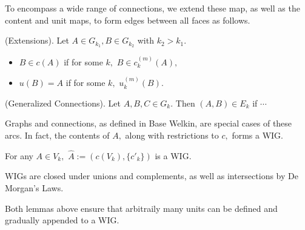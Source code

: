To encompass a wide range of connections, we extend these map, as well as the content and unit maps, to form edges between all faces as follows.
\begin{definition} (Extensions). Let $A \in G_{k_{1}}, B \in G_{k_{2}}$ with $k_{2} > k_{1}.$
    \begin{itemize}
      \item $B \in c(A)$ if for some $k,$ $B \in c^{(m)}_{k}(A),$
      \item $u(B) = A$ if for some $k,$ $u^{(m)}_{k}(B).$
    \end{itemize}
\end{definition}


\begin{definition} (Generalized Connections). Let $A, B, C \in G_{k}.$ Then $(A, B) \in E_{k}$ if $\cdots$
\end{definition}

Graphs and connections, as defined in Base Welkin, are special cases of these arcs. In fact, the contents of $A,$ along with restrictions to $c,$ forms a WIG.
\begin{lemma}

For any $A \in V_{k},$ $\hat{A} := (c(V_{k}), \{c'_{k}\})$ is a WIG.
\end{lemma}
\begin{lemma}
WIGs are closed under unions and complements, as well as intersections by De Morgan's Laws. %
\end{lemma}
Both lemmas above ensure that arbitraily many units can be defined and gradually appended to a WIG.



